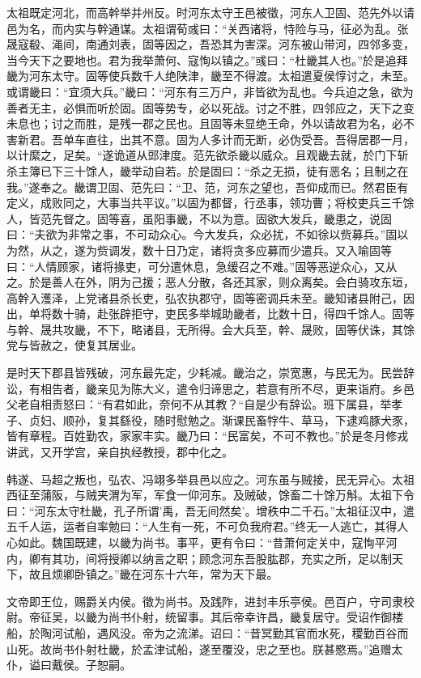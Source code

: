 \documentclass[12pt,UTF8]{ctexbook}
\begin{document}
太祖既定河北，而高幹举并州反。时河东太守王邑被徵，河东人卫固、范先外以请邑为名，而内实与幹通谋。太祖谓荀彧曰：“关西诸将，恃险与马，征必为乱。张晟寇殽、渑间，南通刘表，固等因之，吾恐其为害深。河东被山带河，四邻多变，当今天下之要地也。君为我举萧何、寇恂以镇之。”彧曰：“杜畿其人也。”於是追拜畿为河东太守。固等使兵数千人绝陕津，畿至不得渡。太祖遣夏侯惇讨之，未至。或谓畿曰：“宜须大兵。”畿曰：“河东有三万户，非皆欲为乱也。今兵迫之急，欲为善者无主，必惧而听於固。固等势专，必以死战。讨之不胜，四邻应之，天下之变未息也；讨之而胜，是残一郡之民也。且固等未显绝王命，外以请故君为名，必不害新君。吾单车直往，出其不意。固为人多计而无断，必伪受吾。吾得居郡一月，以计縻之，足矣。“遂诡道从郖津度。范先欲杀畿以威众。且观畿去就，於门下斩杀主簿已下三十馀人，畿举动自若。於是固曰：“杀之无损，徒有恶名；且制之在我。”遂奉之。畿谓卫固、范先曰：“卫、范，河东之望也，吾仰成而已。然君臣有定义，成败同之，大事当共平议。”以固为都督，行丞事，领功曹；将校吏兵三千馀人，皆范先督之。固等喜，虽阳事畿，不以为意。固欲大发兵，畿患之，说固曰：“夫欲为非常之事，不可动众心。今大发兵，众必扰，不如徐以赀募兵。”固以为然，从之，遂为赀调发，数十日乃定，诸将贪多应募而少遣兵。又入喻固等曰：“人情顾家，诸将掾吏，可分遣休息，急缓召之不难。”固等恶逆众心，又从之。於是善人在外，阴为己援；恶人分散，各还其家，则众离矣。会白骑攻东垣，高幹入濩泽，上党诸县杀长吏，弘农执郡守，固等密调兵未至。畿知诸县附己，因出，单将数十骑，赴张辟拒守，吏民多举城助畿者，比数十日，得四千馀人。固等与幹、晟共攻畿，不下，略诸县，无所得。会大兵至，幹、晟败，固等伏诛，其馀党与皆赦之，使复其居业。

是时天下郡县皆残破，河东最先定，少耗减。畿治之，崇宽惠，与民无为。民尝辞讼，有相告者，畿亲见为陈大义，遣令归谛思之，若意有所不尽，更来诣府。乡邑父老自相责怒曰：“有君如此，奈何不从其教？“自是少有辞讼。班下属县，举孝子、贞妇、顺孙，复其繇役，随时慰勉之。渐课民畜牸牛、草马，下逮鸡豚犬豕，皆有章程。百姓勤农，家家丰实。畿乃曰：“民富矣，不可不教也。”於是冬月修戎讲武，又开学宫，亲自执经教授，郡中化之。

韩遂、马超之叛也，弘农、冯翊多举县邑以应之。河东虽与贼接，民无异心。太祖西征至蒲阪，与贼夹渭为军，军食一仰河东。及贼破，馀畜二十馀万斛。太祖下令曰：“河东太守杜畿，孔子所谓'禹，吾无间然矣'。增秩中二千石。”太祖征汉中，遣五千人运，运者自率勉曰：“人生有一死，不可负我府君。”终无一人逃亡，其得人心如此。魏国既建，以畿为尚书。事平，更有令曰：“昔萧何定关中，寇恂平河内，卿有其功，间将授卿以纳言之职；顾念河东吾股肱郡，充实之所，足以制天下，故且烦卿卧镇之。”畿在河东十六年，常为天下最。

文帝即王位，赐爵关内侯。徵为尚书。及践阼，进封丰乐亭侯。邑百户，守司隶校尉。帝征吴，以畿为尚书仆射，统留事。其后帝幸许昌，畿复居守。受诏作御楼船，於陶河试船，遇风没。帝为之流涕。诏曰：“昔冥勤其官而水死，稷勤百谷而山死。故尚书仆射杜畿，於孟津试船，遂至覆没，忠之至也。朕甚愍焉。”追赠太仆，谥曰戴侯。子恕嗣。
\end{document}
